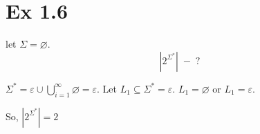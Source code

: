 \section*{Ex 1.6}
\begin{mdframed}
	let $\Sigma = \varnothing$.
	\[
		|2^{\Sigma^*}| \;-\; ?
	\]
\end{mdframed}

$\Sigma^* = {\varepsilon} \cup \bigcup_{i=1}^\infty \varnothing = {\varepsilon}$.
Let $L_1 \subseteq \Sigma^* = {\varepsilon}$.
$L_1 = \varnothing$ or $L_1 = {\varepsilon}$.

So, $\displaystyle |2^{\Sigma^*}| = 2$